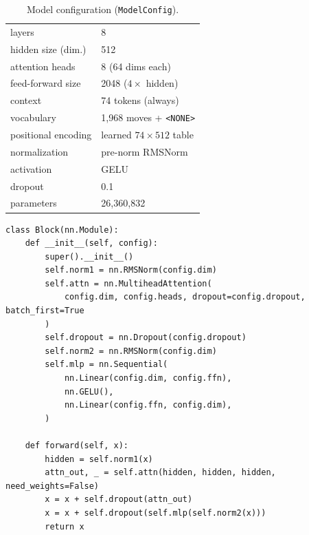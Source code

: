 \documentclass[10pt,a4paper]{article}
\newcommand{\code}[1]{\texttt{#1}}
\begin{document}
\begin{table}[htbp]
\centering
\small
\begin{tabular}{@{}ll@{}}
\toprule
layers                    & 8 \\
hidden size (dim.)        & 512 \\
attention heads           & 8 (64 dims each) \\
feed-forward size         & 2048 ($4\times$ hidden) \\
context                   & 74 tokens (always) \\
vocabulary                & 1{,}968 moves + \code{<NONE>} \\
positional encoding       & learned $74\times512$ table \\
normalization             & pre-norm RMSNorm~\cite{rmsnorm} \\
activation                & GELU \\
dropout                   & 0.1 \\
parameters                & 26{,}360{,}832 \\
\bottomrule
\end{tabular}
\caption{Model configuration (\code{ModelConfig}).}
\label{tab:config}
\end{table}

\begin{lstlisting}[style=code, caption={One transformer block
(\code{model.py}). Both sublayers follow the \emph{pre-norm} pattern
$x \leftarrow x + f(\mathrm{norm}(x))$: normalize first, then apply, then
add back to the unchanged input.}, label={lst:block}, float=htbp]
class Block(nn.Module):
    def __init__(self, config):
        super().__init__()
        self.norm1 = nn.RMSNorm(config.dim)
        self.attn = nn.MultiheadAttention(
            config.dim, config.heads, dropout=config.dropout, batch_first=True
        )
        self.dropout = nn.Dropout(config.dropout)
        self.norm2 = nn.RMSNorm(config.dim)
        self.mlp = nn.Sequential(
            nn.Linear(config.dim, config.ffn),
            nn.GELU(),
            nn.Linear(config.ffn, config.dim),
        )

    def forward(self, x):
        hidden = self.norm1(x)
        attn_out, _ = self.attn(hidden, hidden, hidden, need_weights=False)
        x = x + self.dropout(attn_out)
        x = x + self.dropout(self.mlp(self.norm2(x)))
        return x
\end{lstlisting}
\end{document}
